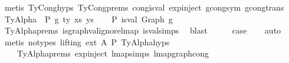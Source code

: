 \begin{isabellebody}
\ {\isacharparenleft}{\kern0pt}metis\ TyCong{\isachardot}{\kern0pt}hyps{\isacharparenleft}{\kern0pt}{}{\isacharcomma}{\kern0pt}{}{\isacharparenright}{\kern0pt}\ TyCong{\isachardot}{\kern0pt}prems{\isacharparenleft}{\kern0pt}{}{\isacharcomma}{\kern0pt}{}{\isacharcomma}{\kern0pt}{}{\isacharparenright}{\kern0pt}\ cong{\isacharunderscore}{\kern0pt}is{\isacharunderscore}{\kern0pt}val\ exp{\isachardot}{\kern0pt}inject{\isacharparenleft}{\kern0pt}{}{\isacharparenright}{\kern0pt}\ gcong{\isachardot}{\kern0pt}sym\ gcong{\isachardot}{\kern0pt}trans{\isacharparenright}{\kern0pt}\isanewline
{}\isamarkupfalse%
\isanewline
\ \ \isamarkupfalse%
\ {\isacharparenleft}{\kern0pt}TyAlpha\ {\isasymGamma}{}\ P\ g{\isacharprime}{\kern0pt}\ ty\ xs{\isacharprime}{\kern0pt}\ ys{\isacharprime}{\kern0pt}{\isacharparenright}{\kern0pt}\isanewline
\ \ \isamarkupfalse%
\ P{}{\isacharcolon}{\kern0pt}\ {\isachardoublequoteopen}is{\isacharunderscore}{\kern0pt}val\ {\isacharparenleft}{\kern0pt}Graph\ g{\isacharprime}{\kern0pt}{\isacharparenright}{\kern0pt}{\isachardoublequoteclose}\isanewline
\ \ \ \ \isamarkupfalse%
\ TyAlpha{\isachardot}{\kern0pt}prems{\isacharparenleft}{\kern0pt}{}{\isacharparenright}{\kern0pt}\ is{\isacharunderscore}{\kern0pt}graph{\isacharunderscore}{\kern0pt}val{\isacharunderscore}{\kern0pt}ignore{\isacharunderscore}{\kern0pt}lmap\ is{\isacharunderscore}{\kern0pt}val{\isachardot}{\kern0pt}simps{\isacharparenleft}{\kern0pt}{}{\isacharparenright}{\kern0pt}\ \isamarkupfalse%
\ blast\isanewline
\ \ \isamarkupfalse%
\ \isamarkupfalse%
\ {\isacharquery}{\kern0pt}case\isanewline
\ \ \isamarkupfalse%
\ auto\isanewline
\ \ \isamarkupfalse%
\ {\isacharparenleft}{\kern0pt}metis\ {\isacharparenleft}{\kern0pt}no{\isacharunderscore}{\kern0pt}types{\isacharcomma}{\kern0pt}\ lifting{\isacharparenright}{\kern0pt}\ ext\ A{}\ P{}\ TyAlpha{\isachardot}{\kern0pt}hyps{\isacharparenleft}{\kern0pt}{}{\isacharcomma}{\kern0pt}{}{\isacharcomma}{\kern0pt}{}{\isacharcomma}{\kern0pt}{}{\isacharcomma}{\kern0pt}{}{\isacharparenright}{\kern0pt}\isanewline
\ \ \ \ TyAlpha{\isachardot}{\kern0pt}prems{\isacharparenleft}{\kern0pt}{}{\isacharcomma}{\kern0pt}{}{\isacharparenright}{\kern0pt}\ exp{\isachardot}{\kern0pt}inject{\isacharparenleft}{\kern0pt}{}{\isacharparenright}{\kern0pt}\ lmap{\isachardot}{\kern0pt}simps{\isacharparenleft}{\kern0pt}{}{\isacharparenright}{\kern0pt}\ lmap{\isacharunderscore}{\kern0pt}graph{\isacharunderscore}{\kern0pt}cong\isanewline

\end{isabellebody}
